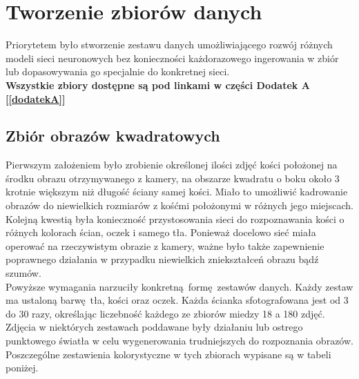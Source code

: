 
\chapter{Tworzenie zbiorów danych}
Priorytetem było stworzenie zestawu danych
umożliwiającego rozwój różnych modeli sieci neuronowych bez konieczności każdorazowego
ingerowania w zbiór lub dopasowywania go specjalnie do konkretnej sieci.\\
\textbf{Wszystkie zbiory dostępne są pod linkami w części Dodatek A [\ref{dodatekA}] }

\section{Zbiór obrazów kwadratowych}
Pierwszym założeniem było zrobienie określonej ilości zdjęć kości położonej na środku
obrazu otrzymywanego z kamery, na obszarze kwadratu o boku około 3 krotnie większym
niż długość ściany samej kości. Miało to umożliwić kadrowanie obrazów
do niewielkich rozmiarów z kośćmi położonymi w różnych jego miejscach.\\
Kolejną kwestią była konieczność przystosowania sieci do rozpoznawania kości o
różnych kolorach ścian, oczek i samego tła. Ponieważ docelowo sieć
miała operować na rzeczywistym obrazie z kamery, ważne było także zapewnienie poprawnego
działania w przypadku niewielkich zniekształceń obrazu bądź szumów.\\
Powyższe wymagania narzuciły konkretną formę zestawów danych.
Każdy zestaw ma ustaloną barwę tła, kości oraz oczek. Każda ścianka sfotografowana jest
od 3 do 30 razy, określając liczebność każdego ze zbiorów miedzy 18 a 180 zdjęć.
Zdjęcia w niektórych zestawach poddawane były działaniu lub ostrego punktowego światła
w celu wygenerowania trudniejszych do rozpoznania obrazów. Poszczególne zestawienia
kolorystyczne w tych zbiorach wypisane są w tabeli poniżej. \newpage

